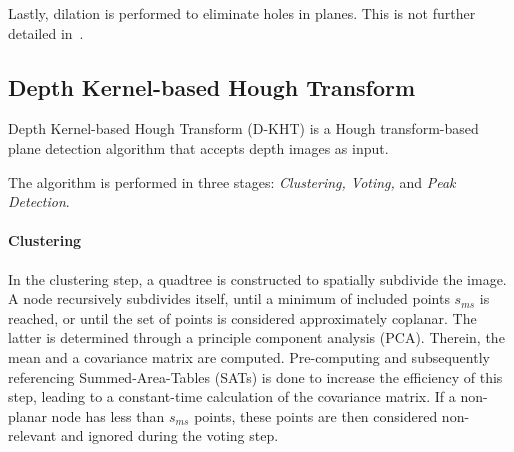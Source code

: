 \documentclass[main.tex]{subfiles}
\begin{document}
Lastly, dilation is performed to eliminate holes in planes. This is not further detailed in~\cite[Section~III.B]{Mols_Li_Hanebeck_2020}.


\subsection{Depth Kernel-based Hough Transform}
\label{subsec:bg-dkht}
Depth Kernel-based Hough Transform (D-KHT) \cite{Vera_Lucio_Fernandes_Velho_2018} is a Hough transform-based plane detection
algorithm that accepts depth images as input.

The algorithm is performed in three stages: \textit{Clustering, Voting,} and \textit{Peak Detection}.

\paragraph{Clustering}
In the clustering step, a quadtree is constructed to spatially subdivide the image. A node recursively subdivides
itself, until a minimum of included points $s_{ms}$ is reached, or until the set of points is considered approximately
coplanar. The latter is determined through a principle component analysis (PCA). Therein, the mean and
a covariance matrix are computed.
Pre-computing and subsequently referencing Summed-Area-Tables (SATs) is done to increase the efficiency
of this step, leading to a constant-time calculation of the covariance matrix.
If a non-planar node has less than $s_{ms}$ points, these points are then considered non-relevant and
ignored during the voting step.
\end{document}
